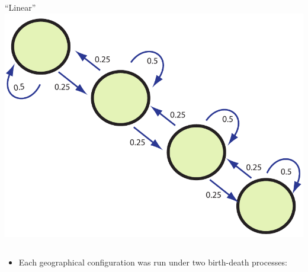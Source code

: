 \documentclass[11pt,t]{beamer}
\begin{document}
\begin{frame}
\begin{columns}
			\begin{column}[c]{0.4 \textwidth}
				\begin{center}
				``Linear''			\\
				\includegraphics[scale=0.25]{linear-model.pdf}
				\end{center}				
			\end{column}							
		\end{columns}

	\begin{itemize}
	\item Each geographical configuration was run under two birth-death processes: 

	\end{itemize}

\end{frame}
\end{document}
